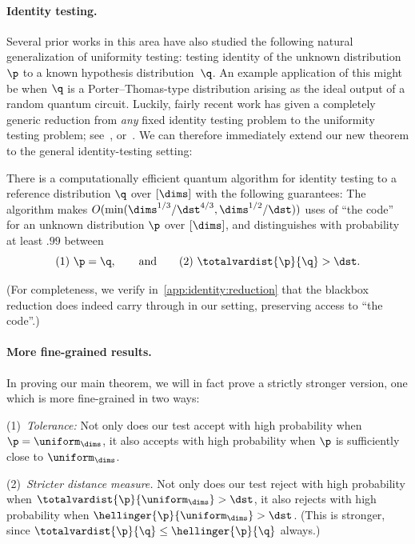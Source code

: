 \documentclass[11pt]{article}
\begin{document}
\paragraph{Identity testing.} 
Several prior works in this area have also studied the following natural generalization of uniformity testing: testing identity of the unknown distribution~$\p$ to a known hypothesis distribution~$\q$.
An example application of this might be when $\q$ is a Porter--Thomas-type distribution arising as the ideal output of a random quantum circuit. 
Luckily, fairly recent work has given a completely generic reduction from \emph{any} fixed identity testing problem to the uniformity testing problem; see~\cite{Goldreich:16}, or~\cite[Section~2.2.3]{CanonneTopicsDT2022}. We can therefore immediately extend our new theorem to the general identity-testing setting:
\begin{corollary}
  There is a computationally efficient quantum algorithm for identity testing to a reference distribution $\q$ over $[\dims]$ with the following guarantees: The algorithm makes $O(\min(\dims^{1/3}/\dst^{4/3}, \dims^{1/2}/\dst))$ uses of  ``the code'' for an unknown distribution $\p$ over $[\dims]$, and distinguishes with probability at least $.99$ between
\begin{equation}
    (1)~\p=\q, \qquad \text{and} \qquad (2)~\totalvardist{\p}{\q} > \dst.    
\end{equation}
\end{corollary}
\noindent(For completeness, we verify in~\cref{app:identity:reduction} that the blackbox reduction does indeed carry through in our setting, preserving access to ``the code''.)


\paragraph{More fine-grained results.}
In proving our main theorem, we will in fact prove a strictly stronger version, one which is more fine-grained in two ways: 

(1)~\emph{Tolerance:} Not only does our test accept with high probability when $\p = \uniform_\dims$, it also accepts with high probability when $\p$ is sufficiently close to $\uniform_\dims$.  

(2)~\emph{Stricter distance measure.} Not only does our test reject with high probability when $\totalvardist{\p}{\uniform_\dims} > \dst$, it also rejects with high probability when $\hellinger{\p}{\uniform_\dims} > \dst$.
(This is stronger, since $\totalvardist{\p}{\q} \leq \hellinger{\p}{\q}$ always.)
\end{document}
